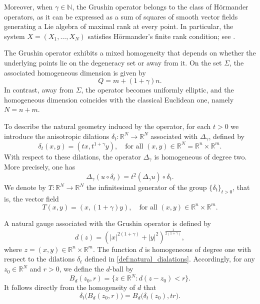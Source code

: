 \documentclass[11pt]{article}
\newcommand{\Gr}{\Delta_{\gamma}}
\begin{document}
Moreover, when $\gamma \in \mathbb{N}$, the Grushin operator belongs to the class of H\"{o}rmander operators, as it can be expressed as a sum of squares of smooth vector fields generating a Lie algebra of maximal rank at every point. In particular, the system $X = (X_1, \dots, X_N)$ satisfies H\"{o}rmander’s finite rank condition; see \cite{hormander_rankcondn}.

The Grushin operator exhibits a mixed homogeneity that depends on whether the underlying points lie on the degeneracy set or away from it. On the set $\Sigma$, the associated homogeneous dimension is given by
\begin{equation}\label{eq:homogeneous_dim}
    Q = m + (1+\gamma)n.
\end{equation}
In contrast, away from $\Sigma$, the operator becomes uniformly elliptic, and the homogeneous dimension coincides with the classical Euclidean one, namely $N = n + m$.

To describe the natural geometry induced by the operator, for each $t > 0$ we introduce the anisotropic dilations $\delta_t : \mathbb{R}^N \to \mathbb{R}^N$ associated with $\Delta_\gamma$, defined by
\begin{equation}\label{def:natural_dialations}
    \delta_t(x, y) = (t x, t^{1+\gamma} y), \quad \text{for all } (x, y) \in \mathbb{R}^N = \mathbb{R}^n \times \mathbb{R}^m.
\end{equation}
With respect to these dilations, the operator $\Delta_\gamma$ is homogeneous of degree two. More precisely, one has
\begin{equation*}
    \Gr (u \circ \delta_t) = t^2 (\Gr u) \circ \delta_t.
\end{equation*}
We denote by $T : \mathbb{R}^N \to \mathbb{R}^N$ the infinitesimal generator of the group $\{\delta_t\}_{t>0}$, that is, the vector field
\begin{equation*}
    T(x, y) = (x, (1+\gamma)y), \quad \text{for all } (x, y) \in \mathbb{R}^n \times \mathbb{R}^m.
\end{equation*}

A natural gauge associated with the Grushin operator is defined by
\begin{equation}\label{def:gauge_grushin}
    d(z) = \left( |x|^{2(1+\gamma)} + |y|^2 \right)^{\frac{1}{2(1+\gamma)}},
\end{equation}
where $z = (x, y) \in \mathbb{R}^n \times \mathbb{R}^m$. The function $d$ is homogeneous of degree one with respect to the dilations $\delta_t$ defined in \eqref{def:natural_dialations}. Accordingly, for any $z_0 \in \mathbb{R}^N$ and $r > 0$, we define the $d$-ball by
\begin{equation*}
    B_d(z_0, r) = \{ z \in \mathbb{R}^N : d(z - z_0) < r \}.
\end{equation*}
It follows directly from the homogeneity of $d$ that
\begin{equation*}
    \delta_t\bigl(B_d(z_0, r)\bigr) = B_d\bigl(\delta_t(z_0), t r\bigr).
\end{equation*}
\end{document}
